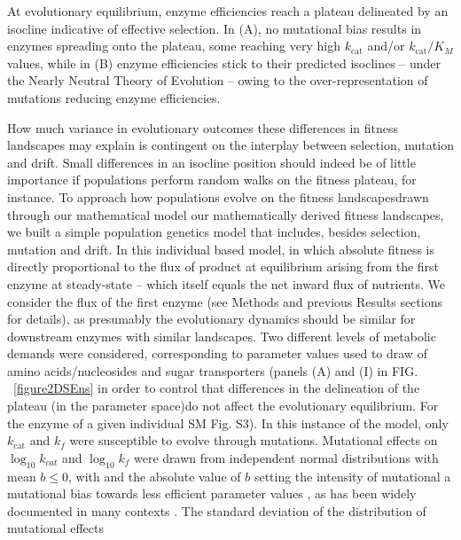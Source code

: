 \documentclass[11pt,onecolumn]{article}
\providecommand{\DIFadd}[1]{{\protect\color{blue} \sf #1}} %
\providecommand{\DIFdel}[1]{{\protect\color{red} \scriptsize #1}} %
\providecommand{\DIFaddbegin}{} %
\providecommand{\DIFaddend}{} %
\providecommand{\DIFdelbegin}{} %
\providecommand{\DIFdelend}{} %
\providecommand{\DIFdelFL}[1]{\DIFdel{#1}} %
\providecommand{\DIFdelbeginFL}{} %
\providecommand{\DIFdelendFL}{} %
\begin{document}
\begin{figure*}[h!]
{\DIFdelbeginFL \DIFdelFL{At evolutionary equilibrium, enzyme efficiencies reach a plateau delineated by an isocline indicative of effective selection. In (A), no mutational bias results in enzymes spreading onto the plateau, some reaching very high $k_\text{cat}$ and/or $k_\text{cat}/K_M$ values, while in (B) enzyme efficiencies stick to their predicted isoclines -- under the Nearly Neutral Theory of Evolution \citep{Ohta92} -- owing to the over-representation of mutations reducing enzyme efficiencies.%
}\DIFdelendFL }
\label{figure2D_Evolutionary_results}
\end{figure*}

\DIFaddbegin \DIFadd{How much variance in evolutionary outcomes these differences in fitness landscapes may explain is contingent on the interplay between selection, mutation and drift. Small differences in an isocline position should indeed be of little importance if populations perform random walks on the fitness plateau, for instance. }\DIFaddend To approach how populations evolve on \DIFdelbegin \DIFdel{the fitness landscapesdrawn through our mathematical model}\DIFdelend \DIFaddbegin \DIFadd{our mathematically derived fitness landscapes}\DIFaddend , we built a simple population genetics model \DIFdelbegin \DIFdel{that includes, besides selection, mutation and drift. In this individual based model, }\DIFdelend \DIFaddbegin \DIFadd{in which }\DIFaddend absolute fitness is directly proportional to the flux \DIFdelbegin \DIFdel{of product at equilibrium }\DIFdelend \DIFaddbegin \DIFadd{arising from the first enzyme at steady-state }\DIFaddend -- which itself equals the \DIFaddbegin \DIFadd{net }\DIFaddend inward flux of nutrients. \DIFdelbegin \DIFdel{We consider the flux of the first enzyme (see Methods and previous Results sections for details), as presumably the evolutionary dynamics should be similar for downstream enzymes with similar landscapes. }\DIFdelend Two different levels of metabolic demands were considered, corresponding to parameter values \DIFdelbegin \DIFdel{used to draw }\DIFdelend \DIFaddbegin \DIFadd{of amino acids/nucleosides and sugar transporters (}\DIFaddend panels (A) and (I) in \DIFdelbegin \DIFdel{FIG. ~\ref{figure2DSEns} in order to control that differences in the delineation of the plateau (in the parameter space)do not affect the evolutionary equilibrium. For the enzyme of a given individual}\DIFdelend \DIFaddbegin \DIFadd{SM Fig. S3). In this instance of the model}\DIFaddend , only $k_\text{cat}$ and $k_f$ were susceptible to evolve through mutations. Mutational effects on $\log_{10}k_{cat}$ and $\log_{10}k_f$ were drawn from independent normal distributions with mean $b \leq 0$, \DIFdelbegin \DIFdel{with }\DIFdelend \DIFaddbegin \DIFadd{and }\DIFaddend the absolute value of $b$ setting the intensity of \DIFdelbegin \DIFdel{mutational }\DIFdelend \DIFaddbegin \DIFadd{a mutational bias }\DIFaddend towards less efficient parameter values\DIFaddbegin \DIFadd{, as has been widely documented in many contexts \citep{EyreWalker07,Serohijos12,Heckmann18}}\DIFaddend . The standard deviation of the distribution of mutational effects \DIFdelbegin 
\end{document}
